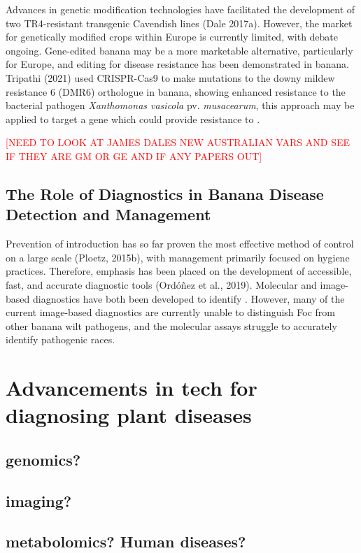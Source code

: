 Advances in genetic modification technologies have facilitated the development of two TR4-resistant transgenic Cavendish lines (Dale \et 2017a). However, the market for genetically modified crops within Europe is currently limited, with debate ongoing.  Gene-edited banana may be a more marketable alternative, particularly for Europe, and editing for disease resistance has been demonstrated in banana. Tripathi \et (2021) used CRISPR-Cas9 to make mutations to the downy mildew resistance 6 (DMR6) orthologue in banana, showing enhanced resistance to the bacterial pathogen \textit{Xanthomonas vasicola }pv. \textit{musacearum}, this approach may be applied to target a gene which could provide resistance to \Foc.  

\textcolor{red}{[NEED TO LOOK AT JAMES DALES NEW AUSTRALIAN VARS AND SEE IF THEY ARE GM OR GE AND IF ANY PAPERS OUT]}

\subsection{The Role of Diagnostics in Banana Disease Detection and Management}

Prevention of \Foc introduction has so far proven the most effective method of \Foc control on a large scale (Ploetz, 2015b), with management primarily focused on hygiene practices. Therefore, emphasis has been placed on the development of accessible, fast, and accurate diagnostic tools (Ordóñez et al., 2019). Molecular and image-based diagnostics have both been developed to identify \Foc. However, many of the current image-based diagnostics are currently unable to distinguish Foc from other banana wilt pathogens, and the molecular assays struggle to accurately identify pathogenic races.  
 

\section{Advancements in tech for diagnosing plant diseases}
\subsection{genomics?}
\subsection{imaging?}
\subsection{metabolomics? Human diseases?}


